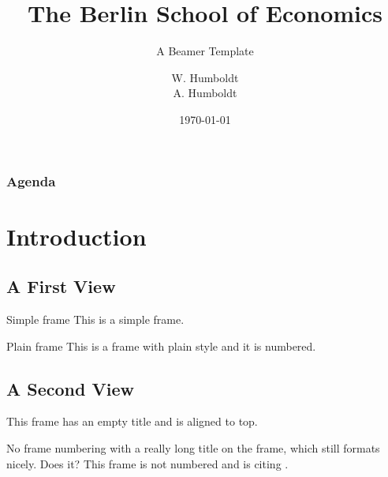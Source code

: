 \documentclass{beamer}
\title[Short Title]{The Berlin School of Economics}
\subtitle{A Beamer Template}
\author[Humboldt \& Humboldt]{W. Humboldt\texorpdfstring{\\}{,} A. Humboldt}
\institute{Berlin School of Economics\\ \footnotesize Conference XYZ}
\date{\today}
\begin{document}
    \begin{frame}
        \maketitle
    \end{frame}
    
    \begin{frame}[t]\frametitle{Agenda}
        \tableofcontents
    \end{frame}

    \section{Introduction}
    \subsection{A First View}
    \begin{frame}{Simple frame}
        This is a simple frame.
    \end{frame}

    \begin{frame}[plain]{Plain frame}
        This is a frame with plain style and it is numbered.
    \end{frame}
    
    \subsection{A Second View}
    \begin{frame}[t]
        This frame has an empty title and is aligned to top.
    \end{frame}
    
    \begin{frame}[noframenumbering]{No frame numbering with a really long title on the frame, which still formats nicely. Does it?}
        This frame is not numbered and is citing \cite{knuth74}.
    \end{frame}
    
\end{document}
